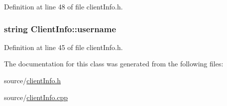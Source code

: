 Definition at line 48 of file client\+Info.\+h.

\subsubsection[{\texorpdfstring{username}{username}}]{\setlength{\rightskip}{0pt plus 5cm}string Client\+Info\+::username\hspace{0.3cm}{\ttfamily [private]}}\hypertarget{class_client_info_abb5d48a0c38e02d8ae706be2cfd63877}{}\label{class_client_info_abb5d48a0c38e02d8ae706be2cfd63877}


Definition at line 45 of file client\+Info.\+h.



The documentation for this class was generated from the following files\+:\begin{DoxyCompactItemize}
\item 
source/\hyperlink{client_info_8h}{client\+Info.\+h}\item 
source/\hyperlink{client_info_8cpp}{client\+Info.\+cpp}\end{DoxyCompactItemize}
